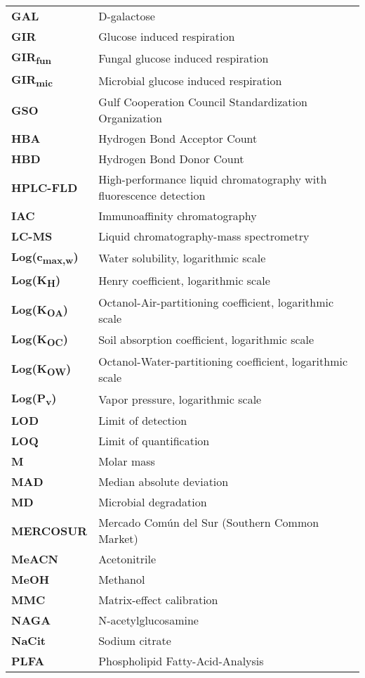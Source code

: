 \begin{normalsize}
\begin{longtable}{ll}
\textbf{GAL} & D-galactose\\
\textbf{GIR} & Glucose induced respiration\\
\textbf{GIR\textsubscript{fun}} & Fungal glucose induced respiration\\
\textbf{GIR\textsubscript{mic}} & Microbial glucose induced respiration\\
\textbf{GSO} & Gulf Cooperation Council Standardization Organization\\
\textbf{HBA} & Hydrogen Bond Acceptor Count\\
\textbf{HBD} & Hydrogen Bond Donor Count\\
\textbf{HPLC-FLD} & High-performance liquid chromatography with fluorescence detection\\
\textbf{IAC} & Immunoaffinity chromatography\\
\textbf{LC-MS} & Liquid chromatography-mass spectrometry\\
\textbf{Log(c\textsubscript{max,w})} & Water solubility, logarithmic scale\\
\textbf{Log(K\textsubscript{H})} & Henry coefficient, logarithmic scale\\
\textbf{Log(K\textsubscript{OA})} & Octanol-Air-partitioning coefficient, logarithmic scale\\
\textbf{Log(K\textsubscript{OC})} & Soil absorption coefficient, logarithmic scale\\
\textbf{Log(K\textsubscript{OW})} & Octanol-Water-partitioning coefficient, logarithmic scale\\
\textbf{Log(P\textsubscript{v})} & Vapor pressure, logarithmic scale\\
\textbf{LOD} & Limit of detection\\
\textbf{LOQ} & Limit of quantification\\
\textbf{M} & Molar mass\\
\textbf{MAD} & Median absolute deviation\\
\textbf{MD} & Microbial degradation\\
\textbf{MERCOSUR} & Mercado Común del Sur (Southern Common Market)\\
\textbf{MeACN} & Acetonitrile\\
\textbf{MeOH} & Methanol\\
\textbf{MMC} & Matrix-effect calibration\\
\textbf{NAGA} & N-acetylglucosamine\\
\textbf{NaCit} & Sodium citrate\\
\textbf{PLFA} & Phospholipid Fatty-Acid-Analysis\\

\end{longtable}
\end{normalsize}
